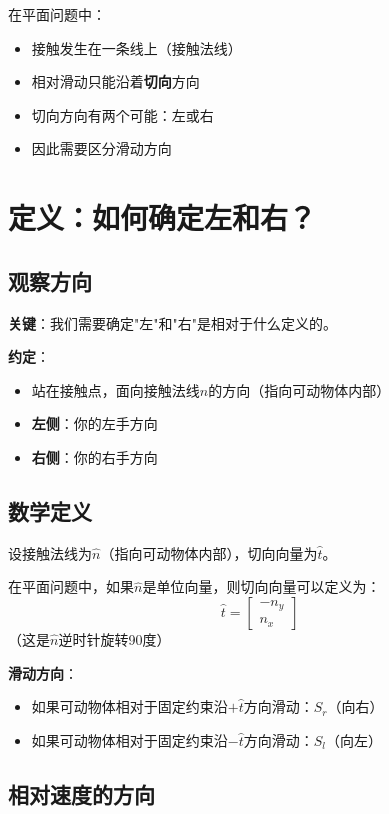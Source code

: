 \documentclass[12pt,a4paper]{article}
\begin{document}
在平面问题中：
\begin{itemize}
\item 接触发生在一条线上（接触法线）
\item 相对滑动只能沿着\textbf{切向}方向
\item 切向方向有两个可能：左或右
\item 因此需要区分滑动方向
\end{itemize}

\section{定义：如何确定左和右？}

\subsection{观察方向}

\textbf{关键}：我们需要确定"左"和"右"是相对于什么定义的。

\textbf{约定}：
\begin{itemize}
\item 站在接触点，面向接触法线$\hat{n}$的方向（指向可动物体内部）
\item \textbf{左侧}：你的左手方向
\item \textbf{右侧}：你的右手方向
\end{itemize}

\subsection{数学定义}

设接触法线为$\hat{n}$（指向可动物体内部），切向向量为$\hat{t}$。

在平面问题中，如果$\hat{n}$是单位向量，则切向向量可以定义为：
\begin{equation}
\hat{t} = \begin{bmatrix} -n_y \\ n_x \end{bmatrix}
\end{equation}
（这是$\hat{n}$逆时针旋转90度）

\textbf{滑动方向}：
\begin{itemize}
\item 如果可动物体相对于固定约束沿$+\hat{t}$方向滑动：$S_r$（向右）
\item 如果可动物体相对于固定约束沿$-\hat{t}$方向滑动：$S_l$（向左）
\end{itemize}

\subsection{相对速度的方向}
\end{document}
